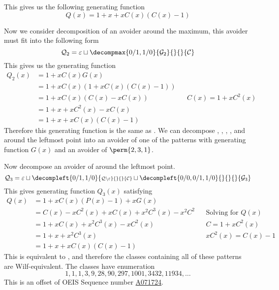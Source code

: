 This gives us the following generating function
\begin{equation}
    Q(x) = 1 + x + xC(x)(C(x)-1) \label{eq:qgen}
\end{equation}

Now we consider decomposition of an avoider
 around the maximum,
this avoider must fit into the following form
\begin{equation*}
    \mathcal{Q}_2 = \varepsilon \sqcup
    \decompmax{0/1,1/0}{\mathcal{G}_2}{}{}{\mathcal{C}}
\end{equation*}
This gives us the generating function
\begin{equation*}
    \begin{aligned}
        Q_2(x) &= 1+xC(x)G(x)\\
        &= 1+xC(x)(1+xC(x)(C(x)-1))\\
        &= 1 +xC(x)(C(x)-xC(x)) && C(x) = 1+xC^2(x)\\
        &= 1 +x + xC^2(x) - xC(x) \\
        &= 1 +x + xC(x)(C(x)-1)
    \end{aligned}
\end{equation*}
Therefore this generating function is the same as .
We can decompose
,
,
,
,
and  around the leftmost point
into an avoider of one of the patterns with generating function \(G(x)\) and
an avoider of \(\perm{2,3,1}\).

Now decompose an avoider of 
around the leftmost point.
\begin{equation*}
    \mathcal{Q}_3 = \varepsilon \sqcup
    \decompleft{0/1,1/0}{\scriptstyle \mathcal{Q}\setminus\varepsilon}{}{}{\mathcal{C}}
    \sqcup \decompleft{0/0,0/1,1/0}{}{}{}{\mathcal{G}_3}
\end{equation*}
This gives generating function \(Q_3(x)\) satisfying
\begin{equation*}
    \begin{aligned}
        Q(x) &= 1 +xC(x)(P(x)-1) + xG(x)\\
        &= C(x) - xC^2(x) + xC(x) +x^2C^3(x) - x^2C^2 && \text{Solving for \(Q(x)\)}\\
        &= 1 + xC(x) +x^2C^3(x)-xC^2(x) && C = 1+xC^2(x)\\
        &= 1 + x + x^2C^3(x) && xC^2(x) = C(x)-1\\
        &= 1 + x + xC(x)(C(x)-1)
    \end{aligned}
\end{equation*}
This is equivalent to , and therefore
the classes containing all of these patterns are Wilf-equivalent.
The classes have enumeration
\begin{equation*}
    1, 1, 1, 3, 9, 28, 90, 297, 1001, 3432, 11934,\dotsc
\end{equation*}
This is an offset of OEIS Sequence number \href{http://oeis.org/A071724}{A071724}.

